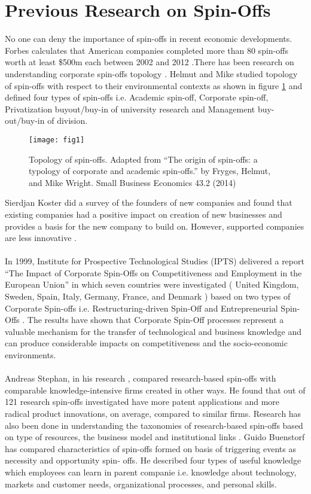 \section{Previous Research on Spin-Offs\label{sec:previous_r_spin}}
No one can deny the importance of spin-offs in recent economic developments. Forbes calculates
that American companies completed more than 80 spin-offs worth at least \$500m each between
2002 and 2012 \cite{12}.There has been research on understanding corporate spin-offs topology \cite{23}. 
Helmut and Mike \cite{24} studied topology of spin-offs with respect to their environmental contexts as
shown in figure \ref{fig1} and defined four types of spin-offs i.e. Academic spin-off, Corporate spin-off,
Privatization buyout/buy-in of university research and Management buy-out/buy-in of division.

\begin{figure}[htb]
	\centering
	\texttt{[image: fig1]}
	\caption{Topology of spin-offs. Adapted from ``The origin of spin-offs: a typology of corporate and academic spin-offs.'' by Fryges, Helmut, and Mike Wright. Small Business Economics 43.2 (2014)}
	\label{fig1}
\end{figure}

Sierdjan Koster did a survey of the founders of new companies and found that existing companies
had a positive impact on creation of new businesses and provides a basis for the new company to
build on. However, supported companies are less innovative \cite{50}.
\\
\\
In 1999, Institute for Prospective Technological Studies (IPTS) delivered a report ``The Impact of
Corporate Spin-Offs on Competitiveness and Employment in the European Union'' in which seven
countries were investigated ( United Kingdom, Sweden, Spain, Italy, Germany, France, and
Denmark ) based on two types of Corporate Spin-offs i.e. Restructuring-driven Spin-Off and
Entrepreneurial Spin-Offs \cite{26}. The results have shown that Corporate Spin-Off processes represent
a valuable mechanism for the transfer of technological and business knowledge and can produce
considerable impacts on competitiveness and the socio-economic environments. 
\\
\\
Andreas Stephan, in his research \cite{22}, compared research-based spin-offs with comparable knowledge-intensive firms
created in other ways. He found that out of 121 research spin-offs investigated have more patent
applications and more radical product innovations, on average, compared to similar firms.
Research has also been done in understanding the taxonomies of research-based spin-offs based on
type of resources, the business model and institutional links \cite{27}. Guido Buenstorf \cite{28} has compared
characteristics of spin-offs formed on basis of triggering events as necessity and opportunity spin-
offs. He described four types of useful knowledge which employees can learn in parent
companie i.e. knowledge about technology, markets and customer needs, organizational
processes, and personal skills.


